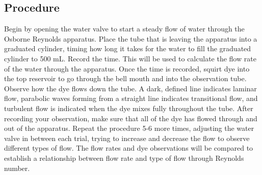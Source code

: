 \documentclass{article}
\begin{document}
\subsection{Procedure}
\par Begin by opening the water valve to start a steady flow of water through the Osborne Reynolds apparatus. Place the tube that is leaving the apparatus into a graduated cylinder,
timing how long it takes for the water to fill the graduated cylinder to 500 mL. Record the time. This will be used to calculate the flow rate of the water through the apparatus. Once the time is recorded, squirt dye into the top reservoir to go through the bell mouth and into the observation tube. Observe how the dye flows down the tube. A dark, defined line indicates laminar flow, parabolic waves forming from a straight line indicates transitional flow, and turbulent flow is indicated when the dye mixes fully throughout the tube. After recording your observation, make sure that all of the dye has flowed through and out of the apparatus. Repeat the procedure 5-6 more times, adjusting the water valve in between each trial, trying to increase and decrease the flow to observe different types of flow. The flow rates and dye observations will be compared to establish a relationship between flow rate and type of flow through Reynolds number.

\newpage
\end{document}

